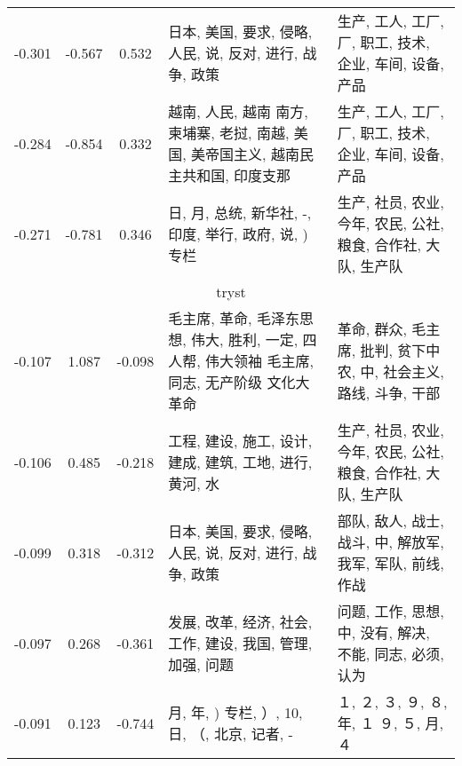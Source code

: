 \begin{tabular}{cccp{5cm}p{5cm}}
-0.301 & -0.567 & 0.532 & 日本, 美国, 要求, 侵略, 人民, 说, 反对, 进行, 战争, 政策 & 生产, 工人, 工厂, 厂, 职工, 技术, 企业, 车间, 设备, 产品 \\
-0.284 & -0.854 & 0.332 & 越南, 人民, 越南 南方, 柬埔寨, 老挝, 南越, 美国, 美帝国主义, 越南民主共和国, 印度支那 & 生产, 工人, 工厂, 厂, 职工, 技术, 企业, 车间, 设备, 产品 \\
-0.271 & -0.781 & 0.346 & 日, 月, 总统, 新华社, -, 印度, 举行, 政府, 说, ) 专栏 & 生产, 社员, 农业, 今年, 农民, 公社, 粮食, 合作社, 大队, 生产队 \\
\midrule
\multicolumn{5}{c}{tryst}\\
-0.107 & 1.087 & -0.098 & 毛主席, 革命, 毛泽东思想, 伟大, 胜利, 一定, 四人帮, 伟大领袖 毛主席, 同志, 无产阶级 文化大革命 & 革命, 群众, 毛主席, 批判, 贫下中农, 中, 社会主义, 路线, 斗争, 干部 \\
-0.106 & 0.485 & -0.218 & 工程, 建设, 施工, 设计, 建成, 建筑, 工地, 进行, 黄河, 水 & 生产, 社员, 农业, 今年, 农民, 公社, 粮食, 合作社, 大队, 生产队 \\
-0.099 & 0.318 & -0.312 & 日本, 美国, 要求, 侵略, 人民, 说, 反对, 进行, 战争, 政策 & 部队, 敌人, 战士, 战斗, 中, 解放军, 我军, 军队, 前线, 作战 \\
-0.097 & 0.268 & -0.361 & 发展, 改革, 经济, 社会, 工作, 建设, 我国, 管理, 加强, 问题 & 问题, 工作, 思想, 中, 没有, 解决, 不能, 同志, 必须, 认为 \\
-0.091 & 0.123 & -0.744 & 月, 年, ) 专栏, ）, 10, 日, （, 北京, 记者, - & １, ２, ３, ９, ８, 年, １ ９, ５, 月, ４ \\
\bottomrule
\end{tabular}
